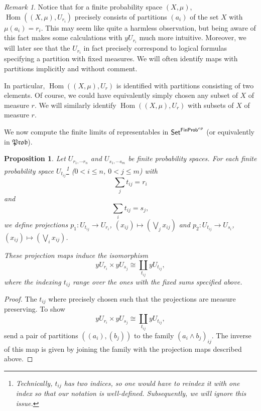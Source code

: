 \documentclass[a4paper]{amsproc}
\theoremstyle{plain}
\newtheorem{proposition}[theorem]{Proposition}
\theoremstyle{definition}
\theoremstyle{remark}
\newtheorem{remark}[theorem]{Remark}
\numberwithin{equation}{section}
\DeclareMathOperator{\Hom}{Hom}
\newcommand{\y}{\textit{y}}
\newcommand{\Set}{\textup{\textsf{Set}}}
\newcommand{\FinProb}{\textup{\textsf{FinProb}}}
\newcommand{\Prob}{\mathfrak{Prob}}
\begin{document}
\begin{remark}\label{classifying_partitions}
    Notice that for a finite probability space $(X,\mu)$, $\Hom((X,\mu), U_{r_i})$ precisely consists of partitions $(a_i)$ of the set $X$ with $\mu(a_i) = r_i$. This may seem like quite a harmless observation, but being aware of this fact makes some calculations with $\y U_{r_i}$ much more intuitive. Moreover, we will later see that the $U_{r_i}$ in fact precisely correspond to logical formulas specifying a partition with fixed measures. We will often identify maps with partitions implicitly and without comment.

    In particular, $\Hom((X,\mu), U_r)$ is identified with partitions consisting of two elements. Of course, we could have equivalently simply chosen any subset of $X$ of measure $r$. We will similarly identify $\Hom((X,\mu), U_r)$ with subsets of $X$ of measure $r$.

\end{remark}

We now compute the finite limits of representables in $\Set^{\FinProb^{op}}$ (or equivalently in $\Prob$).

\begin{proposition} \label{multi-product}
    Let $U_{r_1, \cdots r_n}$ and $U_{s_1, \cdots s_m}$ be finite probability spaces. For each finite probability space $U_{t_{ij}}$\footnote{Technically, $t_{ij}$ has two indices, so one would have to reindex it with one index so that our notation is well-defined. Subsequently, we will ignore this issue.} ($0 < i \leq n$, $0 < j \leq m$) with
    \[
        \sum_j t_{ij} = r_i
    \]
    and
    \[
        \sum_i t_{ij} = s_j ,
    \]
    we define projections $p_1: U_{t_{ij}} \to U_{r_i}$, $(x_{ij}) \mapsto (\bigvee_j x_{ij})$ and $p_2: U_{t_{ij}} \to U_{s_i}$, $(x_{ij}) \mapsto (\bigvee_i x_{ij})$.

    These projection maps induce the isomorphism
    \[
    \y U_{r_i} \times \y U_{s_j} \cong \coprod_{t_{ij}} \y U_{t_{ij}} ,
    \]
    where the indexing $t_{ij}$ range over the ones with the fixed sums specified above.
\end{proposition}
\begin{proof}
    The $t_{ij}$ where precisely chosen such that the projections are measure preserving. To show
    \[
    \y U_{r_i} \times \y U_{s_j} \cong \coprod_{t_{ij}} \y U_{t_{ij}} ,
    \]
    send a pair of partitions $((a_i),(b_j))$ to the family $(a_i \wedge b_j)_{ij}$. The inverse of this map is given by joining the family with the projection maps described above.
\end{proof}
\end{document}
